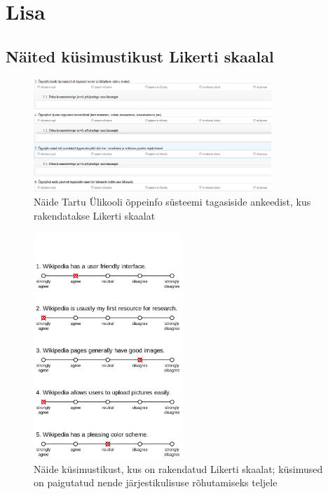 \documentclass[a4paper,12pt,oneside]{article}
\numberwithin{equation}{section}
\theoremstyle{definition}
\begin{document}
\pagebreak
{}




\section*{Lisa}

\begin{subappendices}
\subsection{Näited küsimustikust Likerti skaalal}


\begin{figure}[H]
\centering
\includegraphics[width=0.8\textwidth]{ois_tagasiside_toodeldud.png}
\caption{Näide Tartu \"Ulikooli õppeinfo s\"usteemi tagasiside ankeedist, kus rakendatakse Likerti skaalat \cite{UT}}
\label{likert1}
\end{figure}

\begin{figure}[H]
\centering
\includegraphics[width=0.5\textwidth, height = 0.7\textwidth]{Example_Likert_Scale.png}
\caption{Näide k\"usimustikust, kus on rakendatud Likerti skaalat; k\"usimused on paigutatud nende järjestikulisuse rõhutamiseks teljele\cite{Smith}}
\label{likert2}
\end{figure}




\end{subappendices}
\end{document}
